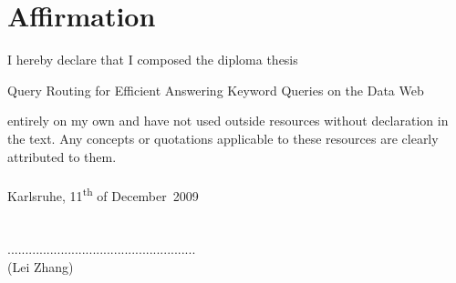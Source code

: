 \chapter*{Affirmation}
\thispagestyle{empty}

\vspace{2cm}
I hereby declare that I composed the diploma thesis \\
\begin{center}
{\large Query Routing for Efficient Answering Keyword Queries on the Data Web}\\[0.5cm]
\end{center}

entirely on my own and have not used outside resources without declaration in the text. Any concepts or quotations applicable to these resources are clearly attributed to them.
\\
\\
Karlsruhe, 11\textsuperscript{th} of December \,2009\\
\\
\\
\hspace*{8.0cm}.....................................................\\
\hspace*{9.1cm}(Lei Zhang)
